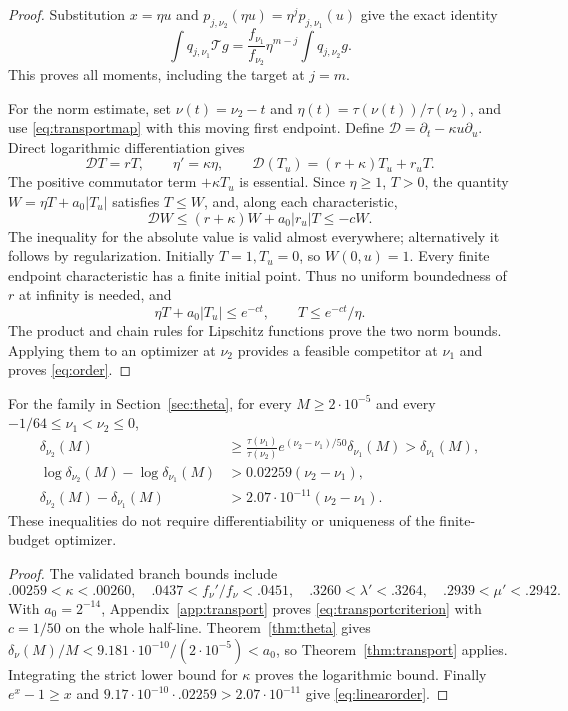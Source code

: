 \begin{proof}
Substitution \(x=\eta u\) and
\(p_{j,\nu_2}(\eta u)=\eta^jp_{j,\nu_1}(u)\) give the exact identity
\[
 \int q_{j,\nu_1}\mathcal T g
   =\frac{f_{\nu_1}}{f_{\nu_2}}\eta^{m-j}\int q_{j,\nu_2}g .
\]
This proves all moments, including the target at \(j=m\).

For the norm estimate, set \(\nu(t)=\nu_2-t\) and
\(\eta(t)=\tau(\nu(t))/\tau(\nu_2)\), and use \eqref{eq:transportmap}
with this moving first endpoint. Define
\(\mathcal D=\partial_t-\kappa u\partial_u\).
Direct logarithmic differentiation gives
\[
 \mathcal DT=rT,\qquad \eta'=\kappa\eta,\qquad
 \mathcal D(T_u)=(r+\kappa)T_u+r_uT .
\]
The positive commutator term \(+\kappa T_u\) is essential.
Since \(\eta\geq1\), \(T>0\), the quantity
\(W=\eta T+a_0|T_u|\) satisfies \(T\leq W\), and, along each
characteristic,
\[
 \mathcal DW\leq(r+\kappa)W+a_0|r_u|T\leq-cW .
\]
The inequality for the absolute value is valid almost everywhere;
alternatively it follows by regularization. Initially \(T=1,T_u=0\),
so \(W(0,u)=1\). Every finite endpoint characteristic has a finite
initial point. Thus no uniform boundedness of \(r\) at infinity is
needed, and
\[
 \eta T+a_0|T_u|\leq e^{-ct},\qquad T\leq e^{-ct}/\eta .
\]
The product and chain rules for Lipschitz functions prove the two norm
bounds. Applying them to an optimizer at \(\nu_2\) provides a feasible
competitor at \(\nu_1\) and proves \eqref{eq:order}.
\end{proof}

\begin{corollary}\label{cor:thetaorder}
For the family in Section~\ref{sec:theta}, for every \(M\geq2\cdot10^{-5}\)
and every \(-1/64\leq\nu_1<\nu_2\leq0\),
\begin{align}
 \delta_{\nu_2}(M)
 &\geq\frac{\tau(\nu_1)}{\tau(\nu_2)}
          e^{(\nu_2-\nu_1)/50}\delta_{\nu_1}(M)
  >\delta_{\nu_1}(M),\label{eq:thetaorder}\\
 \log\delta_{\nu_2}(M)-\log\delta_{\nu_1}(M)
 &>0.02259(\nu_2-\nu_1),\nonumber\\
 \delta_{\nu_2}(M)-\delta_{\nu_1}(M)
 &>2.07\cdot10^{-11}(\nu_2-\nu_1).\label{eq:linearorder}
\end{align}
These inequalities do not require differentiability or uniqueness of
the finite-budget optimizer.
\end{corollary}
\begin{proof}
The validated branch bounds include
\[
 .00259<\kappa<.00260,\quad .0437<f_\nu'/f_\nu<.0451,
 \quad .3260<\lambda'<.3264,\quad .2939<\mu'<.2942 .
\]
With \(a_0=2^{-14}\), Appendix~\ref{app:transport} proves
\eqref{eq:transportcriterion} with \(c=1/50\) on the whole half-line.
Theorem~\ref{thm:theta} gives
\(\delta_\nu(M)/M<9.181\cdot10^{-10}/(2\cdot10^{-5})<a_0\),
so Theorem~\ref{thm:transport} applies. Integrating the strict lower
bound for \(\kappa\) proves the logarithmic bound.
Finally \(e^x-1\geq x\) and
\(9.17\cdot10^{-10}\cdot.02259>2.07\cdot10^{-11}\)
give \eqref{eq:linearorder}.
\end{proof}

